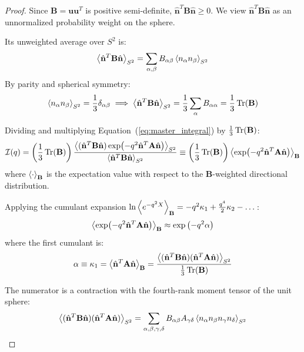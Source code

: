 \documentclass[11pt,a4paper]{article}
\theoremstyle{definition}
\begin{document}
\begin{proof}
Since $\mathbf{B} = \mathbf{u}\mathbf{u}^T$ is positive semi-definite, $\hat{\mathbf{n}}^T \mathbf{B} \hat{\mathbf{n}} \ge 0$. We view $\hat{\mathbf{n}}^T \mathbf{B} \hat{\mathbf{n}}$ as an unnormalized probability weight on the sphere.

Its unweighted average over $S^2$ is:
\begin{equation}
\ev{\hat{\mathbf{n}}^T \mathbf{B} \hat{\mathbf{n}}}_{S^2} = \sum_{\alpha, \beta} B_{\alpha\beta} \ev{n_\alpha n_\beta}_{S^2}
\end{equation}
By parity and spherical symmetry:
\begin{equation}
\ev{n_\alpha n_\beta}_{S^2} = \frac{1}{3} \delta_{\alpha\beta} \implies \ev{\hat{\mathbf{n}}^T \mathbf{B} \hat{\mathbf{n}}}_{S^2} = \frac{1}{3} \sum_\alpha B_{\alpha\alpha} = \frac{1}{3} \Tr(\mathbf{B})
\end{equation}

Dividing and multiplying Equation~(\ref{eq:master_integral}) by $\frac{1}{3}\Tr(\mathbf{B})$:
\begin{equation}
\mathcal{I}(q) = \left( \frac{1}{3} \Tr(\mathbf{B}) \right) \frac{\ev{(\hat{\mathbf{n}}^T \mathbf{B} \hat{\mathbf{n}}) \exp(-q^2 \hat{\mathbf{n}}^T \mathbf{A} \hat{\mathbf{n}})}_{S^2}}{\ev{\hat{\mathbf{n}}^T \mathbf{B} \hat{\mathbf{n}}}_{S^2}} \equiv \left( \frac{1}{3} \Tr(\mathbf{B}) \right) \ev{\exp(-q^2 \hat{\mathbf{n}}^T \mathbf{A} \hat{\mathbf{n}})}_{\mathbf{B}}
\end{equation}
where $\ev{\cdot}_{\mathbf{B}}$ is the expectation value with respect to the $\mathbf{B}$-weighted directional distribution.

Applying the cumulant expansion $\ln \ev{e^{-q^2 X}}_{\mathbf{B}} = -q^2 \kappa_1 + \frac{q^4}{2} \kappa_2 - \dots$:
\begin{equation}
\ev{\exp(-q^2 \hat{\mathbf{n}}^T \mathbf{A} \hat{\mathbf{n}})}_{\mathbf{B}} \approx \exp\left( -q^2 \alpha \right)
\end{equation}
where the first cumulant is:
\begin{equation}
\alpha \equiv \kappa_1 = \ev{\hat{\mathbf{n}}^T \mathbf{A} \hat{\mathbf{n}}}_{\mathbf{B}} = \frac{\ev{(\hat{\mathbf{n}}^T \mathbf{B} \hat{\mathbf{n}})(\hat{\mathbf{n}}^T \mathbf{A} \hat{\mathbf{n}})}_{S^2}}{\frac{1}{3}\Tr(\mathbf{B})}
\label{eq:alpha_ratio}
\end{equation}

The numerator is a contraction with the fourth-rank moment tensor of the unit sphere:
\begin{equation}
\ev{(\hat{\mathbf{n}}^T \mathbf{B} \hat{\mathbf{n}})(\hat{\mathbf{n}}^T \mathbf{A} \hat{\mathbf{n}})}_{S^2} = \sum_{\alpha,\beta,\gamma,\delta} B_{\alpha\beta} A_{\gamma\delta} \ev{n_\alpha n_\beta n_\gamma n_\delta}_{S^2}
\end{equation}


\end{proof}
\end{document}
